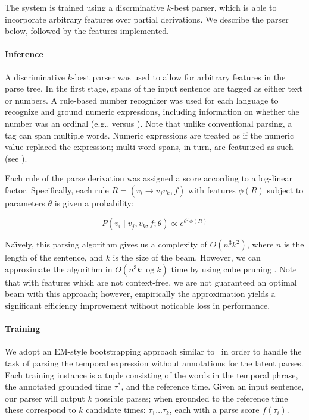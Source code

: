 The system is trained using a discrminative $k$-best parser, which is able to
  incorporate arbitrary features over partial derivations.
We describe the parser below, followed by the features implemented.

\paragraph{Inference}
A discriminative $k$-best parser was used to allow for arbitrary features
  in the parse tree.
In the first stage, spans of the input sentence are tagged as either text
  or numbers.
A rule-based number recognizer was used for each language to recognize and
  ground numeric expressions, including information on whether the number was
  an ordinal (e.g.,  versus ).
Note that unlike conventional parsing, a tag can span multiple words.
Numeric expressions are treated as if the numeric value replaced the
  expression; multi-word spans, in turn, are featurized as such
  (see ).

Each rule of the parse derivation was assigned a score according to a log-linear
  factor.
Specifically, each rule $R = (v_i \rightarrow v_j v_k, f)$
  with features $\phi(R)$ subject to parameters
  $\theta$ is given a probability:

\begin{equation}
P(v_i \mid v_j, v_k, f; \theta) \propto e^{ \theta^T \phi(R) }
\end{equation}

Na\"{\i}vely, this parsing algorithm gives us a complexity of $O(n^3 k^2)$,
  where $n$ is the length of the sentence, and $k$ is the size of the beam.
However, we can approximate the algorithm in $O(n^3 k \log k)$ time by using
  cube pruning \cite{key:2007chiang-cubepruning}.
Note that with features which are not context-free, we are not
  guaranteed an optimal beam with this approach; however, empirically
  the approximation yields a significant efficiency improvement without
  noticable loss in performance.

\paragraph{Training}
We adopt an EM-style bootstrapping approach similar to \me\ in order to handle
  the task of parsing the temporal expression without 
  annotations for the latent parses.
Each training instance is a tuple consisting of the words in the temporal
	phrase, the annotated grounded time $\tau^*$, and the reference time.
Given an input sentence, our parser will output $k$ possible parses; when
  grounded to the reference time these correspond to $k$ candidate times:
  $\tau_1 \dots \tau_k$, each with a parse score $f(\tau_i)$.

